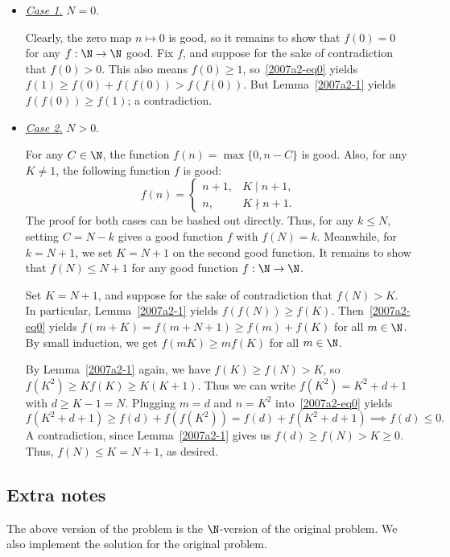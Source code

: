 \begin{itemize}

    \item
    \textit{\underline{Case 1.}}
    $N = 0$.

    Clearly, the zero map $n \mapsto 0$ is good, so it remains to show that $f(0) = 0$ for any $f : \N \to \N$ good.
    Fix $f$, and suppose for the sake of contradiction that $f(0) > 0$.
    This also means $f(0) \geq 1$, so~\eqref{2007a2-eq0} yields $f(1) \geq f(0) + f(f(0)) > f(f(0))$.
    But Lemma~\ref{2007a2-1} yields $f(f(0)) \geq f(1)$; a contradiction.

    \item
    \textit{\underline{Case 2.}}
    $N > 0$.

    For any $C \in \N$, the function $f(n) = \max\{0, n - C\}$ is good.
    Also, for any $K \neq 1$, the following function $f$ is good:
    \[ f(n) = \begin{cases} n + 1, & K \mid n + 1, \\ n, & K \nmid n + 1. \end{cases} \]
    The proof for both cases can be bashed out directly.
    Thus, for any $k \leq N$, setting $C = N - k$ gives a good function $f$ with $f(N) = k$.
    Meanwhile, for $k = N + 1$, we set $K = N + 1$ on the second good function.
    It remains to show that $f(N) \leq N + 1$ for any good function $f : \N \to \N$.

    Set $K = N + 1$, and suppose for the sake of contradiction that $f(N) > K$.
    In particular, Lemma~\ref{2007a2-1} yields $f(f(N)) \geq f(K)$.
    Then~\eqref{2007a2-eq0} yields $f(m + K) = f(m + N + 1) \geq f(m) + f(K)$ for all $m \in \N$.
    By small induction, we get $f(mK) \geq m f(K)$ for all $m \in \N$.

    By Lemma~\ref{2007a2-1} again, we have $f(K) \geq f(N) > K$, so $f(K^2) \geq K f(K) \geq K (K + 1)$.
    Thus we can write $f(K^2) = K^2 + d + 1$ with $d \geq K - 1 = N$.
    Plugging $m = d$ and $n = K^2$ into~\eqref{2007a2-eq0} yields
    \[ f(K^2 + d + 1) \geq f(d) + f(f(K^2)) = f(d) + f(K^2 + d + 1) \implies f(d) \leq 0. \]
    A contradiction, since Lemma~\ref{2007a2-1} gives us $f(d) \geq f(N) > K \geq 0$.
    Thus, $f(N) \leq K = N + 1$, as desired.

\end{itemize}



\subsection*{Extra notes}

The above version of the problem is the $\N$-version of the original problem.
We also implement the solution for the original problem.